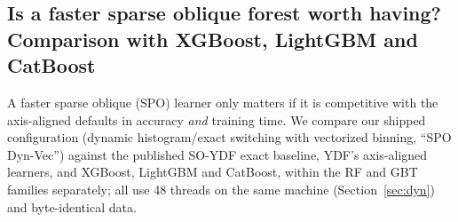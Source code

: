 \subsection{Is a faster sparse oblique forest worth having? Comparison with XGBoost, LightGBM and CatBoost}
\label{sec:spo-vs-gbt}

A faster sparse oblique (SPO) learner only matters if it is competitive with the axis-aligned
defaults in accuracy \emph{and} training time. We compare our shipped configuration (dynamic
histogram/exact switching with vectorized binning, ``SPO Dyn-Vec'') against the published SO-YDF
exact baseline, YDF's axis-aligned learners, and XGBoost, LightGBM and CatBoost, within the RF
and GBT families separately; all use 48 threads on the same machine (Section~\ref{sec:dyn}) and
byte-identical data.


